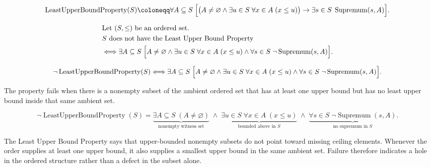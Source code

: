 \begin{remark*}
\[
\operatorname{LeastUpperBoundProperty}(S)\coloneqq
\forall A\subseteq S\;
\Bigl[
\bigl(A\neq\varnothing \land \exists u\in S\;\forall x\in A\;(x\le u)\bigr)
\rightarrow
\exists s\in S\;\operatorname{Supremum}(s,A)
\Bigr].
\]
\end{remark*}

\begin{remark*}
\[
\begin{aligned}
&\text{Let }(S,\le)\text{ be an ordered set}.\\
&S\text{ does not have the Least Upper Bound Property}\\
&\Longleftrightarrow
\exists A\subseteq S\;
\Bigl[
A\neq\varnothing
\land
\exists u\in S\;\forall x\in A\;(x\le u)
\land
\forall s\in S\;\neg\operatorname{Supremum}(s,A)
\Bigr].
\end{aligned}
\]
\end{remark*}

\begin{remark*}
\[
\neg\operatorname{LeastUpperBoundProperty}(S)\Longleftrightarrow
\exists A\subseteq S\;
\Bigl[
A\neq\varnothing
\land
\exists u\in S\;\forall x\in A\;(x\le u)
\land
\forall s\in S\;\neg\operatorname{Supremum}(s,A)
\Bigr].
\]
\end{remark*}

\begin{remark*}
The property fails when there is a nonempty subset of the ambient ordered set that has at least one upper bound but has no least upper bound inside that same ambient set.
\end{remark*}

\begin{remark*}
\[
\neg\operatorname{LeastUpperBoundProperty}(S)
=
\underbrace{\exists A\subseteq S\;(A\neq\varnothing)}_{\text{nonempty witness set}}
\;\land\;
\underbrace{\exists u\in S\;\forall x\in A\;(x\le u)}_{\text{bounded above in }S}
\;\land\;
\underbrace{\forall s\in S\;\neg\operatorname{Supremum}(s,A)}_{\text{no supremum in }S}.
\]
\end{remark*}

\begin{remark*}[Interpretation]
The Least Upper Bound Property says that upper-bounded nonempty subsets do not point toward missing ceiling elements. Whenever the order supplies at least one upper bound, it also supplies a smallest upper bound in the same ambient set. Failure therefore indicates a hole in the ordered structure rather than a defect in the subset alone.
\end{remark*}

